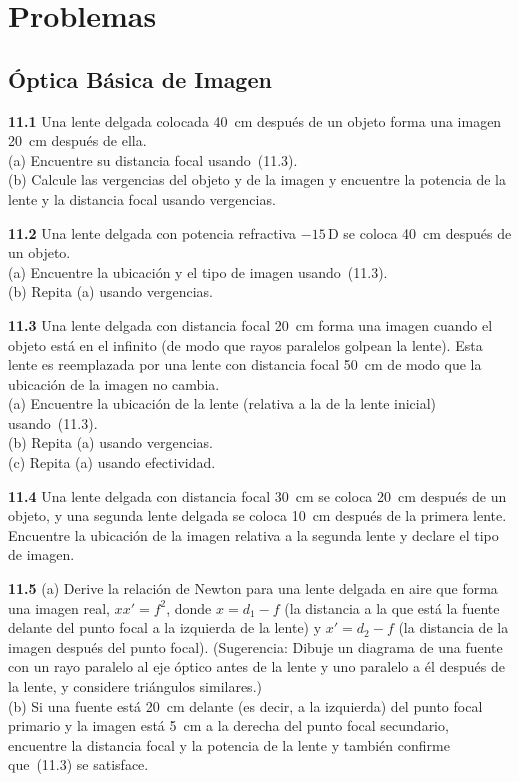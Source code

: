 \documentclass[12pt]{book}
\begin{document}

\section*{Problemas}

\subsection*{Óptica Básica de Imagen}

\textbf{11.1} Una lente delgada colocada 40~cm después de un objeto forma una imagen 20~cm después de ella.\\
(a) Encuentre su distancia focal usando~(11.3).\\
(b) Calcule las vergencias del objeto y de la imagen y encuentre la potencia de la lente y la distancia focal usando vergencias.

\textbf{11.2} Una lente delgada con potencia refractiva $-15\,\text{D}$ se coloca 40~cm después de un objeto.\\
(a) Encuentre la ubicación y el tipo de imagen usando~(11.3).\\
(b) Repita (a) usando vergencias.

\textbf{11.3} Una lente delgada con distancia focal 20~cm forma una imagen cuando el objeto está en el infinito (de modo que rayos paralelos golpean la lente). Esta lente es reemplazada por una lente con distancia focal 50~cm de modo que la ubicación de la imagen no cambia.\\
(a) Encuentre la ubicación de la lente (relativa a la de la lente inicial) usando~(11.3).\\
(b) Repita (a) usando vergencias.\\
(c) Repita (a) usando efectividad.

\textbf{11.4} Una lente delgada con distancia focal 30~cm se coloca 20~cm después de un objeto, y una segunda lente delgada se coloca 10~cm después de la primera lente. Encuentre la ubicación de la imagen relativa a la segunda lente y declare el tipo de imagen.

\textbf{11.5} (a) Derive la relación de Newton para una lente delgada en aire que forma una imagen real, $xx' = f^2$, donde $x = d_1 - f$ (la distancia a la que está la fuente delante del punto focal a la izquierda de la lente) y $x' = d_2 - f$ (la distancia de la imagen después del punto focal). (Sugerencia: Dibuje un diagrama de una fuente con un rayo paralelo al eje óptico antes de la lente y uno paralelo a él después de la lente, y considere triángulos similares.)\\
(b) Si una fuente está 20~cm delante (es decir, a la izquierda) del punto focal primario y la imagen está 5~cm a la derecha del punto focal secundario, encuentre la distancia focal y la potencia de la lente y también confirme que~(11.3) se satisface.
\end{document}
